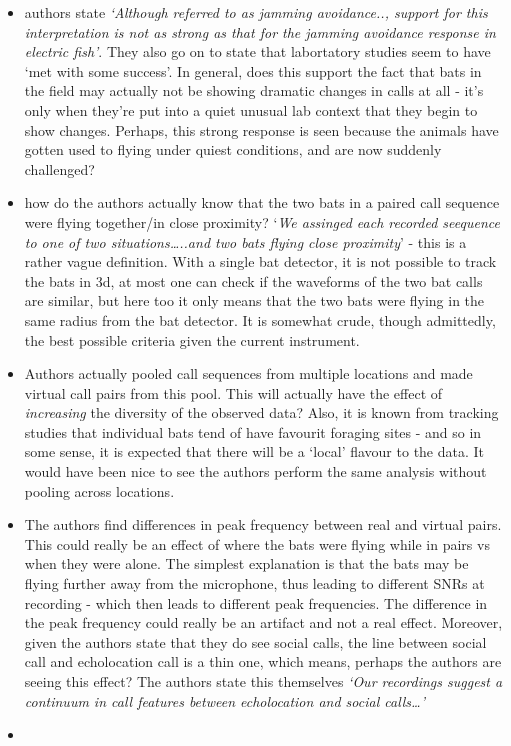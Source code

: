 \documentclass[
]{book}
\providecommand{\tightlist}{%
  \setlength{\itemsep}{0pt}\setlength{\parskip}{0pt}}
\begin{document}
\begin{itemize}
\tightlist
\item
  authors state \emph{`Although referred to as jamming avoidance.., support for this interpretation is not as strong as that for the jamming avoidance response in electric fish'}. They also go on to state that labortatory studies seem to have `met with some success'. In general, does this support the fact that bats in the field may actually not be showing dramatic changes in calls at all - it's only when they're put into a quiet unusual lab context that they begin to show changes. Perhaps, this strong response is seen because the animals have gotten used to flying under quiest conditions, and are now suddenly challenged?
\item
  how do the authors actually know that the two bats in a paired call sequence were flying together/in close proximity? `\emph{We assinged each recorded seequence to one of two situations\ldots..and two bats flying close proximity}' - this is a rather vague definition. With a single bat detector, it is not possible to track the bats in 3d, at most one can check if the waveforms of the two bat calls are similar, but here too it only means that the two bats were flying in the same radius from the bat detector. It is somewhat crude, though admittedly, the best possible criteria given the current instrument.
\item
  Authors actually pooled call sequences from multiple locations and made virtual call pairs from this pool. This will actually have the effect of \emph{increasing} the diversity of the observed data? Also, it is known from tracking studies that individual bats tend of have favourit foraging sites - and so in some sense, it is expected that there will be a `local' flavour to the data. It would have been nice to see the authors perform the same analysis without pooling across locations.
\item
  The authors find differences in peak frequency between real and virtual pairs. This could really be an effect of where the bats were flying while in pairs vs when they were alone. The simplest explanation is that the bats may be flying further away from the microphone, thus leading to different SNRs at recording - which then leads to different peak frequencies. The difference in the peak frequency could really be an artifact and not a real effect. Moreover, given the authors state that they do see social calls, the line between social call and echolocation call is a thin one, which means, perhaps the authors are seeing this effect? The authors state this themselves \emph{`Our recordings suggest a continuum in call features between echolocation and social calls\ldots{}'}
\item
\end{itemize}
\end{document}
